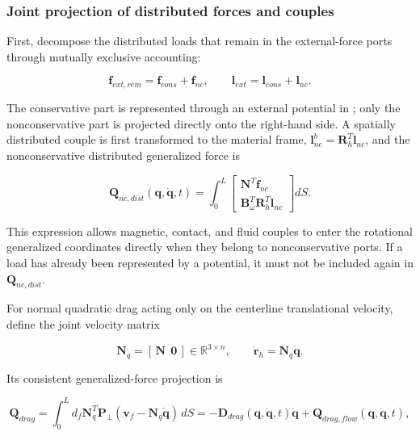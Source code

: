 \subsubsection{Joint projection of distributed forces and couples}\label{sec:galerkin-2-5-3}

First, decompose the distributed loads that remain in the external-force ports through mutually exclusive accounting:

\begin{equation}
\label{eq:galerkin-2-71}
\mathbf{f}_{ext,rem} = \mathbf{f}_{cons} + \mathbf{f}_{nc},\quad\quad\mathbf{l}_{ext} = \mathbf{l}_{cons} + \mathbf{l}_{nc}.
\end{equation}

The conservative part is represented through an external potential in ; only the nonconservative part is projected directly onto the right-hand side. A spatially distributed couple is first transformed to the material frame, \(\mathbf{l}_{nc}^{b} = \mathbf{R}_{h}^{T}\mathbf{l}_{nc}\), and the nonconservative distributed generalized force is

\begin{equation}
\label{eq:galerkin-2-72}
\boxed{\mathbf{Q}_{nc,dist}\left( \mathbf{q},\dot{\mathbf{q}},t \right) = \int_{0}^{L}\begin{bmatrix}
\mathbf{N}^{T}\mathbf{f}_{nc} \\
\mathbf{B}_{\omega}^{T}\mathbf{R}_{h}^{T}\mathbf{l}_{nc}
\end{bmatrix}dS.}
\end{equation}

This expression allows magnetic, contact, and fluid couples to enter the rotational generalized coordinates directly when they belong to nonconservative ports. If a load has already been represented by a potential, it must not be included again in \(\mathbf{Q}_{nc,dist}\).

For normal quadratic drag acting only on the centerline translational velocity, define the joint velocity matrix

\begin{equation}
\label{eq:galerkin-2-73}
\boxed{\mathbf{N}_{q} = \left\lbrack \,\mathbf{N}\ \ \mathbf{0}\, \right\rbrack \in \mathbb{R}^{3 \times n},\quad\quad{\dot{\mathbf{r}}}_{h} = \mathbf{N}_{q}\dot{\mathbf{q}}.}
\end{equation}

Its consistent generalized-force projection is

\begin{equation}
\label{eq:galerkin-2-74}
\mathbf{Q}_{drag} = \int_{0}^{L}d_{f}\mathbf{N}_{q}^{T}\mathbf{P}_{\bot}\left( \mathbf{v}_{f} - \mathbf{N}_{q}\dot{\mathbf{q}} \right)\, dS = - \mathbf{D}_{drag}\left( \mathbf{q},\dot{\mathbf{q}},t \right)\dot{\mathbf{q}} + \mathbf{Q}_{drag,flow}\left( \mathbf{q},\dot{\mathbf{q}},t \right),
\end{equation}

